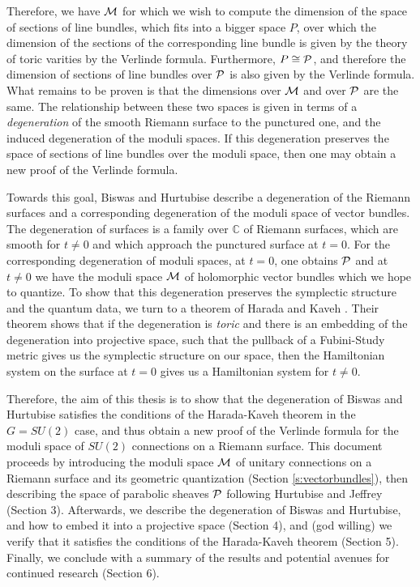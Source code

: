 	Therefore, we have $\mathcal{M}$ for which we wish to compute the dimension of the space of sections of line bundles, which fits into a bigger space $P$, over which the dimension of the sections of the corresponding line bundle is given by the theory of toric varities by the Verlinde formula. Furthermore, $P \cong \mathcal{P}$, and therefore the dimension of sections of line bundles over $\mathcal{P}$ is also given by the Verlinde formula. What remains to be proven is that the dimensions over $\mathcal{M}$ and over $\mathcal{P}$ are the same. The relationship between these two spaces is given in terms of a \textit{degeneration} of the smooth Riemann surface to the punctured one, and the induced degeneration of the moduli spaces. If this degeneration preserves the space of sections of line bundles over the moduli space, then one may obtain a new proof of the Verlinde formula. 
	
	Towards this goal, Biswas and Hurtubise \cite{biswas_degenerations_2021} describe a degeneration of the Riemann surfaces and a corresponding degeneration of the moduli space of vector bundles. The degeneration of surfaces is a family over $\mathbb{C}$ of Riemann surfaces, which are smooth for $t\neq0$ and which approach the punctured surface at $t=0$. For the corresponding degeneration of moduli spaces, at $t=0$, one obtains $\mathcal{P}$ and at $t\neq 0$ we have the moduli space $\mathcal{M}$ of holomorphic vector bundles which we hope to quantize. To show that this degeneration preserves the symplectic structure and the quantum data, we turn to a theorem of Harada and Kaveh \cite{harada_integrable_2015}. Their theorem shows that if the degeneration is \textit{toric} and there is an embedding of the degeneration into projective space, such that the pullback of a Fubini-Study metric gives us the symplectic structure on our space, then the Hamiltonian system on the surface at $t=0$ gives us a Hamiltonian system for $t\neq 0$. 
	
	Therefore, the aim of this thesis is to show that the degeneration of Biswas and Hurtubise satisfies the conditions of the Harada-Kaveh theorem in the $G=SU(2)$ case, and thus obtain a new proof of the Verlinde formula for the moduli space of $SU(2)$ connections on a Riemann surface. This document proceeds by introducing the moduli space $\mathcal{M}$ of unitary connections on a Riemann surface and its geometric quantization (Section \ref{s:vectorbundles}), then describing the space of parabolic sheaves $\mathcal{P}$ following Hurtubise and Jeffrey (Section 3). Afterwards, we describe the degeneration of Biswas and Hurtubise, and how to embed it into a projective space (Section 4), and (god willing) we verify that it satisfies the conditions of the Harada-Kaveh theorem (Section 5). Finally, we conclude with a summary of the results and potential avenues for continued research (Section 6).

